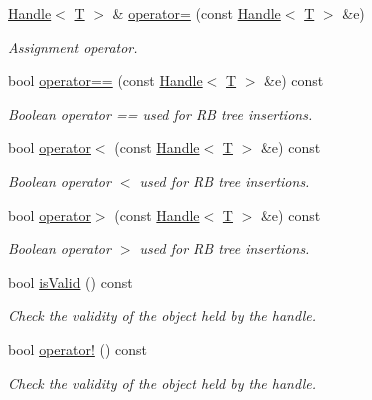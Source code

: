 \begin{DoxyCompactItemize}
\hyperlink{class_d_d4hep_1_1_handle}{Handle}$<$ \hyperlink{class_t}{T} $>$ \& \hyperlink{class_d_d4hep_1_1_handle_a9bbf8f498df42e81ad26fb00233505a6}{operator=} (const \hyperlink{class_d_d4hep_1_1_handle}{Handle}$<$ \hyperlink{class_t}{T} $>$ \&e)
\begin{DoxyCompactList}\small\item\em Assignment operator. \item\end{DoxyCompactList}\item 
bool \hyperlink{class_d_d4hep_1_1_handle_a618470283b3a2cc5ed0545fec90dc759}{operator==} (const \hyperlink{class_d_d4hep_1_1_handle}{Handle}$<$ \hyperlink{class_t}{T} $>$ \&e) const 
\begin{DoxyCompactList}\small\item\em Boolean operator == used for RB tree insertions. \item\end{DoxyCompactList}\item 
bool \hyperlink{class_d_d4hep_1_1_handle_a287ad7d458faab8f84dbfa6fd48e1d30}{operator$<$} (const \hyperlink{class_d_d4hep_1_1_handle}{Handle}$<$ \hyperlink{class_t}{T} $>$ \&e) const 
\begin{DoxyCompactList}\small\item\em Boolean operator $<$ used for RB tree insertions. \item\end{DoxyCompactList}\item 
bool \hyperlink{class_d_d4hep_1_1_handle_a31b4a56e1f449b035e07a38ffd9b7d5a}{operator$>$} (const \hyperlink{class_d_d4hep_1_1_handle}{Handle}$<$ \hyperlink{class_t}{T} $>$ \&e) const 
\begin{DoxyCompactList}\small\item\em Boolean operator $>$ used for RB tree insertions. \item\end{DoxyCompactList}\item 
bool \hyperlink{class_d_d4hep_1_1_handle_a4c5293aecb11989a708ec7615d0f0842}{isValid} () const 
\begin{DoxyCompactList}\small\item\em Check the validity of the object held by the handle. \item\end{DoxyCompactList}\item 
bool \hyperlink{class_d_d4hep_1_1_handle_a20ce72f3771ce4e1a3b58d652efda06d}{operator!} () const 
\begin{DoxyCompactList}\small\item\em Check the validity of the object held by the handle. \item\end{DoxyCompactList}\item 

\end{DoxyCompactItemize}

